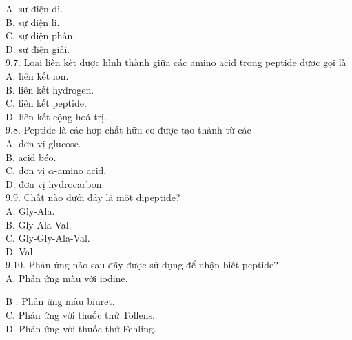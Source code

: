 \documentclass[10pt]{article}
\begin{document}
A. sự điện dì.\\
B. sự điện li.\\
C. sự điện phân.\\
D. sự điện giải.\\
9.7. Loại liên kết được hình thành giữa các amino acid trong peptide được gọi là\\
A. liên kết ion.\\
B. liên kết hydrogen.\\
C. liên kết peptide.\\
D. liên kết cộng hoá trị.\\
9.8. Peptide là các hợp chất hữu cơ được tạo thành từ các\\
A. đơn vị glucose.\\
B. acid béo.\\
C. đơn vị $\alpha$-amino acid.\\
D. đơn vị hydrocarbon.\\
9.9. Chất nào dưới đây là một dipeptide?\\
A. Gly-Ala.\\
B. Gly-Ala-Val.\\
C. Gly-Gly-Ala-Val.\\
D. Val.\\
9.10. Phản ứng nào sau đây được sử dụng để nhận biết peptide?\\
A. Phản ứng màu với iodine.

B . Phản ứng màu biuret.\\
C. Phản ứng với thuốc thử Tollens.\\
D. Phản ứng với thuốc thử Fehling.
\end{document}
